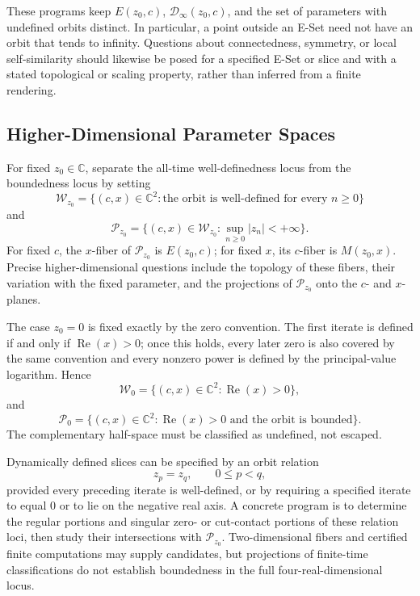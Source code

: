 \documentclass[12pt,a4paper]{amsart}
\theoremstyle{remark}
\newcommand{\C}{\mathbb{C}}
\begin{document}
These programs keep $E(z_0,c)$, $\mathcal{D}_{\infty}(z_0,c)$, and the set of
parameters with undefined orbits distinct. In particular, a point outside an
E-Set need not have an orbit that tends to infinity. Questions about
connectedness, symmetry, or local self-similarity should likewise be posed for
a specified E-Set or slice and with a stated topological or scaling property,
rather than inferred from a finite rendering.

\subsection{Higher-Dimensional Parameter Spaces}

For fixed $z_0\in\C$, separate the all-time well-definedness locus from the
boundedness locus by setting
\[
\mathcal{W}_{z_0}
=
\{(c,x)\in\C^2:
\text{the orbit is well-defined for every }n\ge0\}
\]
and
\[
\mathcal{P}_{z_0}
=
\{(c,x)\in\mathcal{W}_{z_0}:
\sup_{n\ge0}|z_n|<+\infty\}.
\]
For fixed $c$, the $x$-fiber of $\mathcal{P}_{z_0}$ is $E(z_0,c)$; for fixed
$x$, its $c$-fiber is $M(z_0,x)$. Precise higher-dimensional questions include
the topology of these fibers, their variation with the fixed parameter, and the
projections of $\mathcal{P}_{z_0}$ onto the $c$- and $x$-planes.

The case $z_0=0$ is fixed exactly by the zero convention. The first iterate is
defined if and only if $\operatorname{Re}(x)>0$; once this holds, every later
zero is also covered by the same convention and every nonzero power is defined
by the principal-value logarithm. Hence
\[
\mathcal{W}_0
=
\{(c,x)\in\C^2:\operatorname{Re}(x)>0\},
\]
and
\[
\mathcal{P}_0
=
\{(c,x)\in\C^2:
\operatorname{Re}(x)>0
\text{ and the orbit is bounded}\}.
\]
The complementary half-space must be classified as undefined, not escaped.

Dynamically defined slices can be specified by an orbit relation
\[
z_p=z_q,
\qquad
0\le p<q,
\]
provided every preceding iterate is well-defined, or by requiring a specified
iterate to equal $0$ or to lie on the negative real axis. A concrete program is
to determine the regular portions and singular zero- or cut-contact portions of
these relation loci, then study their intersections with $\mathcal{P}_{z_0}$.
Two-dimensional fibers and certified finite computations may supply candidates,
but projections of finite-time classifications do not establish boundedness in
the full four-real-dimensional locus.




\end{document}
